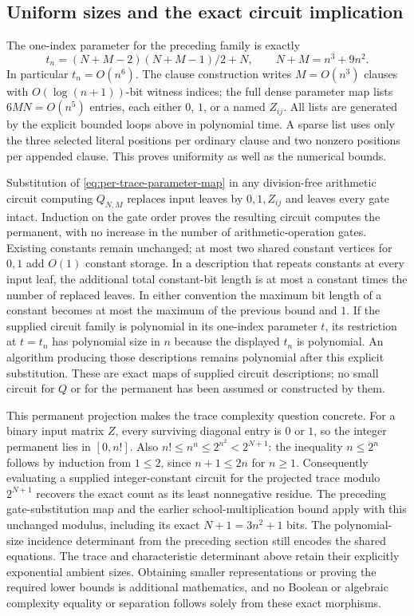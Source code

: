 \subsection{Uniform sizes and the exact circuit implication}

The one-index parameter for the preceding family is exactly
\[
 t_n=(N+M-2)(N+M-1)/2+N,
 \qquad N+M=n^3+9n^2.
\]
In particular $t_n=O(n^6)$. The clause construction writes $M=O(n^3)$
clauses with $O(\log(n+1))$-bit witness indices; the full dense parameter
map lists $6MN=O(n^5)$ entries, each either $0$, $1$, or a named
$Z_{ij}$. All lists are generated by the explicit bounded loops above
in polynomial time. A sparse list uses only the three selected literal
positions per ordinary clause and two nonzero positions per appended
clause. This proves uniformity as well as the numerical bounds.

Substitution of \eqref{eq:per-trace-parameter-map} in any division-free
arithmetic circuit computing $Q_{N,M}$ replaces input leaves by
$0,1,Z_{ij}$ and leaves every gate intact. Induction on the gate order
proves the resulting circuit computes the permanent, with no increase
in the number of arithmetic-operation gates. Existing constants remain
unchanged; at most two shared constant vertices for $0,1$ add $O(1)$
constant storage. In a description that repeats constants at every
input leaf, the additional total constant-bit length is at most a
constant times the number of replaced leaves. In either convention
the maximum bit length of a constant becomes at most the maximum of
the previous bound and $1$. If the supplied circuit family is
polynomial in its one-index parameter $t$, its restriction at $t=t_n$
has polynomial size in $n$ because the displayed $t_n$ is polynomial.
An algorithm producing those descriptions remains polynomial after this
explicit substitution. These are exact maps of supplied circuit
descriptions; no small circuit for $Q$ or for the permanent has been
assumed or constructed by them.

This permanent projection makes the trace complexity question concrete.
For a binary input matrix $Z$, every surviving diagonal entry is $0$
or $1$, so the integer permanent lies in $[0,n!]$. Also
$n!\le n^n\le2^{n^2}<2^{N+1}$: the inequality $n\le2^n$ follows
by induction from $1\le2$, since $n+1\le2n$ for $n\ge1$.
Consequently evaluating a supplied integer-constant circuit for the
projected trace modulo $2^{N+1}$ recovers the exact count as its
least nonnegative residue. The preceding gate-substitution map
and the earlier school-multiplication bound apply with this
unchanged modulus, including its exact $N+1=3n^2+1$ bits.
The polynomial-size incidence determinant from the preceding section
still encodes the shared equations. The trace and characteristic
determinant above retain their explicitly exponential ambient sizes.
Obtaining smaller representations or proving the required lower bounds
is additional mathematics, and no Boolean or algebraic complexity
equality or separation follows solely from these exact morphisms.

